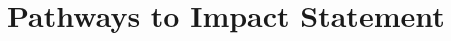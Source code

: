 \section{Pathways to Impact Statement}
\smallskip

\blindtext[1]

\smallskip

\blindtext[2]

\smallskip